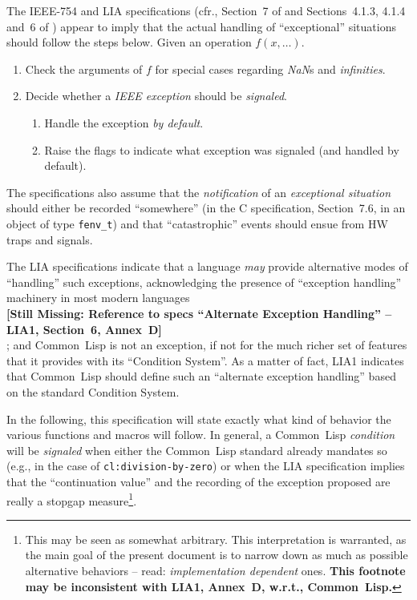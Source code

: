 \documentclass[10pt,fleqn]{article}
\newcommand{\CL}{\textsf{Common~Lisp}}
\newcommand{\CLang}{\textsf{C}}
\newcommand{\missingpart}[1]{{\ }\vspace{2mm}\\
{\textbf{[Still Missing: #1]}}\\
\vspace{2mm}}
\newcommand{\code}[1]{\texttt{#1}}
\newcommand{\clieeeterm}[1]{\textit{#1}}
\newcommand{\IEEEFPStd}{IEEE-754}
\begin{document}
The \IEEEFPStd{} and LIA specifications (cfr., Section~7 of
\cite{2008:IEEE-754} and Sections~4.1.3, 4.1.4 and~6 of
\cite{2012:LIA1}) appear to imply that the actual handling of
``exceptional'' situations should follow the steps below.  Given an
operation $f(x, \ldots)$.

\begin{enumerate}
\item Check the arguments of $f$ for special cases regarding
  \clieeeterm{NaN}s and \clieeeterm{infinities}.
\item Decide whether a \clieeeterm{IEEE exception} should be
  \emph{signaled}.
  \begin{enumerate}
  \item Handle the exception \emph{by default}.
  \item Raise the flags to indicate what exception was signaled (and
    handled by default).
  \end{enumerate}
\end{enumerate}

The specifications also assume that the \emph{notification} of an
\emph{exceptional situation} should either be recorded ``somewhere''
(in the \CLang{} specification, Section~7.6, in an object of type
\code{fenv\_t}) and that ``catastrophic'' events should ensue from HW
traps and signals.

The LIA specifications indicate that a language \emph{may} provide
alternative modes of ``handling'' such exceptions, acknowledging the
presence of ``exception handling'' machinery in most modern languages
\missingpart{Reference to specs ``Alternate Exception Handling'' --
  LIA1, Section~6, Annex~D};
and \CL{} is not an exception, if not for the much richer set of
features that it provides with its ``Condition System''.  As a matter
of fact, LIA1 indicates that \CL{} should define such an ``alternate
exception handling'' based on the standard Condition System.

In the following, this specification will state exactly what kind of
behavior the various functions and macros will follow.  In general, a
\CL{} \emph{condition} will be \emph{signaled} when either the \CL{}
standard already mandates so (e.g., in the case of
\code{cl:division-by-zero}) or when the LIA specification implies that
the ``continuation value'' and the recording of the exception proposed
are really a stopgap measure\footnote{This may be seen as somewhat
  arbitrary.  This interpretation is warranted, as the main goal of
  the present document is to narrow down as much as possible
  alternative behaviors -- read: \emph{implementation dependent}
  ones. \textbf{This footnote may be inconsistent with LIA1, Annex~D,
    w.r.t., \CL{}.}}.
\end{document}
